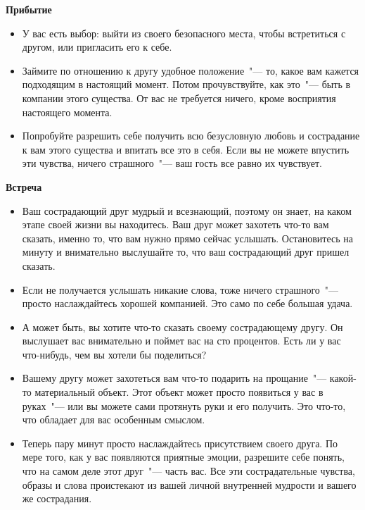 {\large \textbf{Прибытие}}
\begin{itemize}
	\item У вас есть выбор: выйти из своего безопасного места, чтобы встретиться с другом, или пригласить его к себе.
	
	\item Займите по отношению к другу удобное положение~"--- то, какое вам кажется подходящим в настоящий момент. Потом прочувствуйте, как это~"--- быть в компании этого существа. От вас не требуется ничего, кроме восприятия настоящего момента.
	
	\item Попробуйте разрешить себе получить всю безусловную любовь и сострадание к вам этого существа и впитать все это в себя. Если вы не можете впустить эти чувства, ничего страшного~"--- ваш гость все равно их чувствует.
\end{itemize}

\vspace{3ex}

{\large \textbf{Встреча}}
\begin{itemize}
	\item Ваш сострадающий друг мудрый и всезнающий, поэтому он знает, на каком этапе своей жизни вы находитесь. Ваш друг может захотеть что-то вам сказать, именно то, что вам нужно прямо сейчас услышать. Остановитесь на минуту и внимательно выслушайте то, что ваш сострадающий друг пришел сказать.
	
	\item Если не получается услышать никакие слова, тоже ничего страшного~"--- просто наслаждайтесь хорошей компанией. Это само по себе большая удача.
	
	\item А может быть, вы хотите что-то сказать своему сострадающему другу. Он выслушает вас внимательно и поймет вас на сто процентов. Есть ли у вас что-нибудь, чем вы хотели бы поделиться?
	
	\item Вашему другу может захотеться вам что-то подарить на прощание~"--- какой-то материальный объект. Этот объект может просто появиться у вас в руках~"--- или вы можете сами протянуть руки и его получить. Это что-то, что обладает для вас особенным смыслом.
	
	\item Теперь пару минут просто наслаждайтесь присутствием своего друга. По мере того, как у вас появляются приятные эмоции, разрешите себе понять, что на самом деле этот друг~"--- часть вас. Все эти сострадательные чувства, образы и слова проистекают из вашей личной внутренней мудрости и вашего же сострадания.
\end{itemize}

